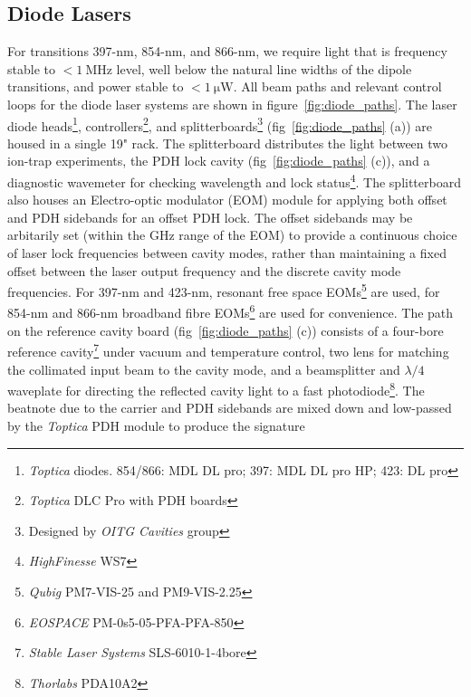 \subsection{Diode Lasers}
\label{sec:Diode Lasers}
    For transitions 397-nm, 854-nm, and 866-nm, we require light that is frequency stable
    to $<1~\unit{\mega\hertz}$ level, well below the natural line widths of the
    dipole transitions, and power stable to $<1~\unit{\micro\watt}$. 
    All beam paths and relevant control loops for the diode laser systems are
    shown in figure~\ref{fig:diode_paths}. The laser diode
    heads\footnote{\emph{Toptica} diodes. 854/866: MDL DL pro; 397: MDL DL pro
    HP; 423: DL pro}, controllers\footnote{\emph{Toptica} DLC Pro with PDH
    boards}, and splitterboards\footnote{Designed by \emph{OITG Cavities} group}
    (fig~\ref{fig:diode_paths} (a)) are housed in a single 19" rack. The
    splitterboard distributes the light between two ion-trap experiments, the
    PDH lock cavity (fig~\ref{fig:diode_paths} (c)), and a diagnostic wavemeter
    for checking wavelength and lock status\footnote{\emph{HighFinesse} WS7}.
    The splitterboard also houses an Electro-optic modulator (EOM) module for
    applying both offset and PDH sidebands for an offset PDH lock. The offset sidebands may be arbitarily set (within the $\unit{\giga\hertz}$ range of the EOM) to provide a continuous choice of laser lock frequencies between cavity modes, rather than maintaining a fixed offset between the laser output frequency and the discrete cavity mode frequencies. For 397-nm
    and 423-nm, resonant free space EOMs\footnote{\emph{Qubig} PM7-VIS-25 and PM9-VIS-2.25}
    are used, for 854-nm and 866-nm broadband fibre EOMs\footnote{\emph{EOSPACE} PM-0s5-05-PFA-PFA-850} are used
    for convenience. The path on the reference cavity board
    (fig~\ref{fig:diode_paths} (c)) consists of a four-bore reference
    cavity\footnote{\emph{Stable Laser Systems} SLS-6010-1-4bore} under vacuum and
    temperature control, two lens for matching the collimated input beam to the
    cavity mode, and a beamsplitter and $\lambda/4$ waveplate for directing the
    reflected cavity light to a fast photodiode\footnote{\emph{Thorlabs} PDA10A2}.
    The beatnote due to the carrier and PDH sidebands are mixed down and
    low-passed by the \emph{Toptica} PDH module to produce the signature
